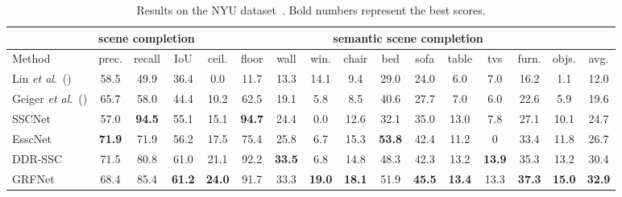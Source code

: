 \documentclass[10pt,twocolumn,letterpaper]{article}
\def\etal{\emph{et al}.}
\begin{document}
\begin{table*}[t]
\begin{center}
\scalebox{0.8}
{
\begin{tabular}{l |c c c|c c c c c c c c c c c c} 
\hline
  & \multicolumn{3}{c|}{scene completion} & \multicolumn{12}{c}{semantic scene completion} \\ \hline
Method  & prec. & recall & IoU & \cellcolor{rgb1}ceil. & \cellcolor{rgb2}floor & \cellcolor{rgb3}wall & \cellcolor{rgb4}win. & \cellcolor{rgb5}chair & \cellcolor{rgb6}bed & \cellcolor{rgb7}sofa & \cellcolor{rgb8}table & \cellcolor{rgb9}tvs & \cellcolor{rgb10}furn. & \cellcolor{rgb11}objs. & avg. \\ 
\hline
Lin \etal~(\cite{lin2013holistic})
& 58.5 & 49.9 & 36.4 &  0.0 & 11.7 & 13.3 & 14.1 &  9.4 & 29.0 & 24.0 &  6.0 &  7.0 & 16.2 &  1.1 & 12.0\\
Geiger \etal~(\cite{geiger2015joint}) & 65.7 & 58.0 & 44.4 & 10.2 & 62.5 & 19.1 &  5.8 &  8.5 & 40.6 & 27.7 &  7.0 &  6.0 & 22.6 &  5.9 & 19.6\\ 
SSCNet~\cite{song2017_SSCNet} & 57.0 & {\bfseries 94.5} & 55.1 & 15.1 & {\bfseries 94.7} & 24.4 &  0.0 & 12.6 & 32.1 & 35.0 & 13.0 &  7.8 & 27.1 & 10.1 & 24.7\\
EsscNet~\cite{zhang2018efficient}   & {\bfseries 71.9} & 71.9 & 56.2 & 17.5 & 75.4 & 25.8 &  6.7 & 15.3 & {\bfseries 53.8} & 42.4 & 11.2 &    0 & 33.4 & 11.8 & 26.7\\ 

DDR-SSC~\cite{li2019rgbd}  & 71.5  & 80.8 & 61.0 & 21.1 & 92.2 & {\bfseries 33.5} & 6.8 & 14.8 & 48.3 & 42.3 &  13.2 & {\bfseries 13.9} & 35.3 & 13.2 & 30.4 \\ 

GRFNet & 68.4 & 85.4 & {\bfseries 61.2}  &  {\bfseries 24.0} & 91.7 & 33.3 & {\bfseries 19.0} & {\bfseries 18.1} & 51.9 & {\bfseries 45.5} & {\bfseries 13.4} &  13.3 & {\bfseries 37.3} & {\bfseries 15.0}  & {\bfseries 32.9}  \\
\hline
\end{tabular}
}
\caption{Results on the NYU dataset~\cite{silberman2012indoor}. Bold numbers represent the best scores.}
\vspace{-0.3cm}
\label{tab:NYU}
\end{center}
\end{table*}
\end{document}

